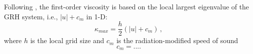 \documentclass[times,doublespace]{fldauth}%
\begin{document}
Following \cite{our_jcp_radhy_paper}, the first-order viscosity is based on the local largest eigenvalue of the GRH system, i.e., $|u| + c_m$ in 1-D:
%
\begin{equation}
\label{eq:equation8}
\kappa_{max} = \frac{h}{2} \left( |u| + c_m \right) \,,
\end{equation}  
%
where $h$ is the local grid size and $c_m$ is the radiation-modified speed of sound
\begin{equation}
c_m = ....
\end{equation}
\end{document}

